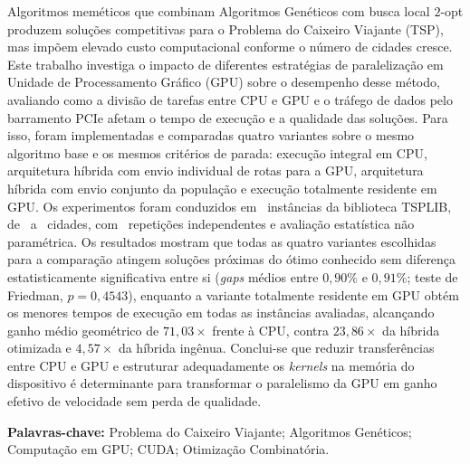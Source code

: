 \begin{resumo}\label{resumo}
      Algoritmos meméticos que combinam Algoritmos Genéticos com busca local \(2\)-opt produzem soluções competitivas para o Problema do Caixeiro Viajante (TSP), mas impõem elevado custo computacional conforme o número de cidades cresce.
      Este trabalho investiga o impacto de diferentes estratégias de paralelização em Unidade de Processamento Gráfico (GPU) sobre o desempenho desse método, avaliando como a divisão de tarefas entre CPU e GPU e o tráfego de dados pelo barramento PCIe afetam o tempo de execução e a qualidade das soluções.
      Para isso, foram implementadas e comparadas quatro variantes sobre o mesmo algoritmo base e os mesmos critérios de parada: execução integral em CPU, arquitetura híbrida com envio individual de rotas para a GPU, arquitetura híbrida com envio conjunto da população e execução totalmente residente em GPU.
      Os experimentos foram conduzidos em \totalinstancias\ instâncias da biblioteca TSPLIB, de \menorinstancia\ a \maiorinstancia\ cidades, com \totalrepeticoes\ repetições independentes e avaliação estatística não paramétrica.
      Os resultados mostram que todas as quatro variantes escolhidas para a comparação atingem soluções próximas do ótimo conhecido sem diferença estatisticamente significativa entre si (\emph{gaps} médios entre \(0{,}90\%\) e \(0{,}91\%\); teste de Friedman, \(p = 0{,}4543\)), enquanto a variante totalmente residente em GPU obtém os menores tempos de execução em todas as instâncias avaliadas, alcançando ganho médio geométrico de \(71{,}03\times\) frente à CPU, contra \(23{,}86\times\) da híbrida otimizada e \(4{,}57\times\) da híbrida ingênua.
      Conclui-se que reduzir transferências entre CPU e GPU e estruturar adequadamente os \emph{kernels} na memória do dispositivo é determinante para transformar o paralelismo da GPU em ganho efetivo de velocidade sem perda de qualidade.

      \vspace{\onelineskip}
      \noindent\textbf{Palavras-chave:} Problema do Caixeiro Viajante; Algoritmos Genéticos; Computação em GPU; CUDA; Otimização Combinatória.
\end{resumo}


